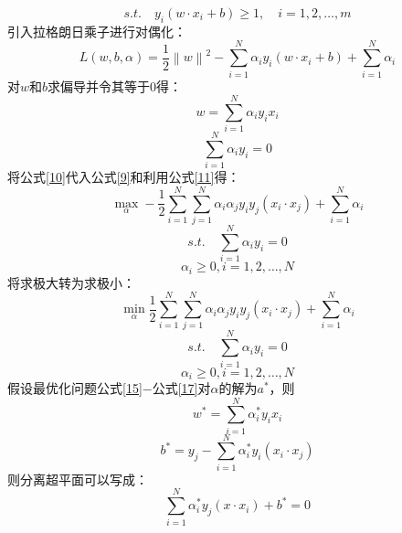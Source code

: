 \documentclass{article}
\begin{document}
	$$	s.t. \quad  y_{i}\left ( w\cdot x_{i}+b \right )\geq 1 , \quad i=1,2,\ldots,m$$
	引入拉格朗日乘子进行对偶化：
	\begin{equation}
	L\left ( w,b,\alpha  \right )=\frac{1}{2}\left \| w \right \|^{2}-\sum_{i=1}^{N}\alpha _{i}y_{i}\left ( w\cdot x_{i}+b \right )+\sum_{i=1}^{N}\alpha _{i}
	\label{9}
	\end{equation}
	对$w$和$b$求偏导并令其等于0得：
	\begin{equation}
	w=\sum_{i=1}^{N}\alpha _{i}y_{i}x_{i}
	\label{10}
	\end{equation}
	\begin{equation}
	\sum_{i=1}^{N}\alpha _{i}y_{i}=0
	\label{11}
	\end{equation}
	将公式\ref{10}代入公式\ref{9}和利用公式\ref{11}得：
	\begin{equation}
	\mathop{max}_{\alpha }-\frac{1}{2}\sum_{i=1}^{N}\sum_{j=1}^{N}\alpha _{i}\alpha _{j}y_{i}y_{j}\left ( x_{i}\cdot x_{j} \right ) + \sum_{i=1}^{N}\alpha _{i}
	\end{equation}
	\begin{equation}
	s.t. \quad \sum_{i=1}^{N}\alpha _{i}y_{i}=0
	\end{equation}
	\begin{equation}
	\alpha _{i}\geq 0,i=1,2,\ldots,N
	\end{equation}
	将求极大转为求极小：
	\begin{equation}
	\mathop{min}_{\alpha }\frac{1}{2}\sum_{i=1}^{N}\sum_{j=1}^{N}\alpha _{i}\alpha _{j}y_{i}y_{j}\left ( x_{i}\cdot x_{j} \right ) + \sum_{i=1}^{N}\alpha _{i}
	\label{15}
	\end{equation}
	\begin{equation}
	s.t. \quad \sum_{i=1}^{N}\alpha _{i}y_{i}=0
	\label{16}
	\end{equation}
	\begin{equation}
	\alpha _{i}\geq 0,i=1,2,\ldots,N
	\label{17}
	\end{equation}
	假设最优化问题公式\ref{15}$-$公式\ref{17}对$\alpha $的解为$a^{*}$，则
	\begin{equation}
	w^{*}=\sum_{i=1}^{N}\alpha _{i}^{*}y_{i}x_{i}
	\label{18}
	\end{equation}
	\begin{equation}
	b^{*}=y_{j}-\sum_{i=1}^{N}\alpha _{i}^{*}y_{i}\left ( x_{i}\cdot x_{j} \right )
	\label{19}
	\end{equation}
	则分离超平面可以写成：
	\begin{equation}
	\sum_{i=1}^{N}\alpha _{i}^{*}y_{j}\left ( x\cdot x_{i} \right )+b^{*}=0
	\end{equation}
\end{document}
